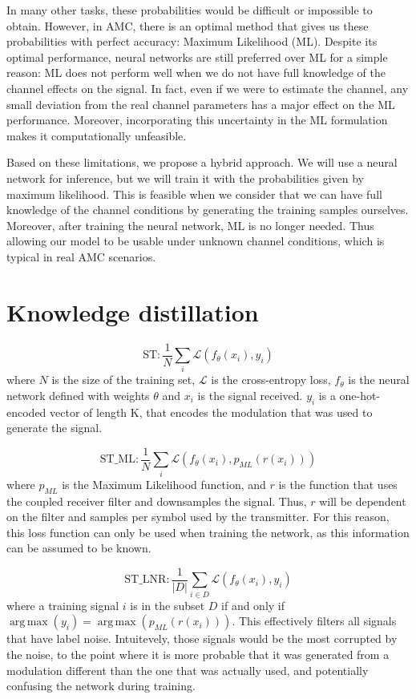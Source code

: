 \documentclass[conference]{IEEEtran}
\newcommand{\Ls}{\mathcal{L}}
\DeclareMathOperator*{\argmax}{arg\,max}
\begin{document}
In many other tasks, these probabilities would be difficult or impossible to obtain. However, in AMC, there is an optimal method that gives us these probabilities with perfect accuracy: Maximum Likelihood (ML). Despite its optimal performance, neural networks are still preferred over ML for a simple reason: ML does not perform well when we do not have full knowledge of the channel effects on the signal. In fact, even if we were to estimate the channel, any small deviation from the real channel parameters has a major effect on the ML performance. Moreover, incorporating this uncertainty in the ML formulation makes it computationally unfeasible.

Based on these limitations, we propose a hybrid approach. We will use a neural network for inference, but we will train it with the probabilities given by maximum likelihood. This is feasible when we consider that we can have full knowledge of the channel conditions by generating the training samples ourselves. Moreover, after training the neural network, ML is no longer needed. Thus allowing our model to be usable under unknown channel conditions, which is typical in real AMC scenarios.


\section{Knowledge distillation}

\begin{equation}
    \text{ST} : \dfrac{1}{N}\sum_{i}\Ls(f_{\theta}(x_i), y_i)
\end{equation}
where $N$ is the size of the training set, $\Ls$ is the cross-entropy loss, $f_{\theta}$ is the neural network defined with weights $\theta$ and $x_i$ is the signal received. $y_i$ is a one-hot-encoded vector of length K, that encodes the modulation that was used to generate the signal.

\begin{equation}
    \text{ST\_ML} : \dfrac{1}{N}\sum_{i}\Ls(f_{\theta}(x_i), p_{ML}(r(x_i)))
\end{equation}
where $p_{ML}$ is the Maximum Likelihood function, and $r$ is the function that uses the coupled receiver filter and downsamples the signal. Thus, $r$ will be dependent on the filter and samples per symbol used by the transmitter. For this reason, this loss function can only be used when training the network, as this information can be assumed to be known.

\begin{equation}
    \text{ST\_LNR} : \dfrac{1}{|D|}\sum_{i \in D}\Ls(f_{\theta}(x_i), y_i)
\end{equation}
where a training signal $i$ is in the subset $D$ if and only if $\argmax(y_i) = \argmax(p_{ML}(r(x_i)))$. This effectively filters all signals that have label noise. Intuitevely, those signals would be the most corrupted by the noise, to the point where it is more probable that it was generated from a modulation different than the one that was actually used, and potentially confusing the network during training.
\end{document}
